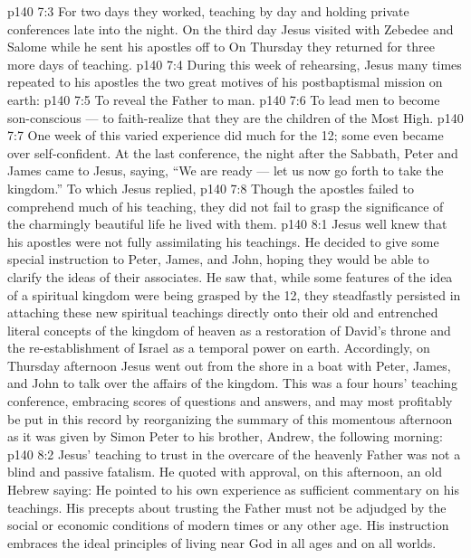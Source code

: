 \vs p140 7:3 For two days they worked, teaching by day and holding private conferences late into the night. On the third day Jesus visited with Zebedee and Salome while he sent his apostles off to  On Thursday they returned for three more days of teaching.
\vs p140 7:4 During this week of rehearsing, Jesus many times repeated to his apostles the two great motives of his postbaptismal mission on earth:
\vs p140 7:5 \bibnobreakspace To reveal the Father to man.
\vs p140 7:6 \bibnobreakspace To lead men to become son\hyp{}conscious --- to faith\hyp{}realize that they are the children of the Most High.
\vs p140 7:7 \pc One week of this varied experience did much for the 12; some even became over self\hyp{}confident. At the last conference, the night after the Sabbath, Peter and James came to Jesus, saying, “We are ready --- let us now go forth to take the kingdom.” To which Jesus replied, 
\vs p140 7:8 Though the apostles failed to comprehend much of his teaching, they did not fail to grasp the significance of the charmingly beautiful life he lived with them.
\vs p140 8:1 Jesus well knew that his apostles were not fully assimilating his teachings. He decided to give some special instruction to Peter, James, and John, hoping they would be able to clarify the ideas of their associates. He saw that, while some features of the idea of a spiritual kingdom were being grasped by the 12, they steadfastly persisted in attaching these new spiritual teachings directly onto their old and entrenched literal concepts of the kingdom of heaven as a restoration of David’s throne and the re\hyp{}establishment of Israel as a temporal power on earth. Accordingly, on Thursday afternoon Jesus went out from the shore in a boat with Peter, James, and John to talk over the affairs of the kingdom. This was a four hours’ teaching conference, embracing scores of questions and answers, and may most profitably be put in this record by reorganizing the summary of this momentous afternoon as it was given by Simon Peter to his brother, Andrew, the following morning:
\vs p140 8:2 \bibnobreakspace {} Jesus’ teaching to trust in the overcare of the heavenly Father was not a blind and passive fatalism. He quoted with approval, on this afternoon, an old Hebrew saying:  He pointed to his own experience as sufficient commentary on his teachings. His precepts about trusting the Father must not be adjudged by the social or economic conditions of modern times or any other age. His instruction embraces the ideal principles of living near God in all ages and on all worlds.
